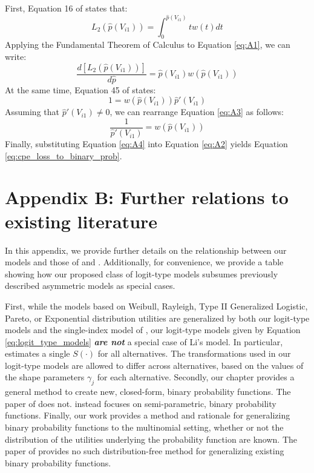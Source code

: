 First, Equation 16 of \citeauthor{buja_loss_2005} states that:
\begin{equation}\tag{A1}
\label{eq:A1}
L_{2} \left( \hat{p} \left( V_{i1} \right) \right) = \int _0 ^{\hat{p}\left( V_{i1} \right)} tw\left(t\right)dt
\end{equation}
Applying the Fundamental Theorem of Calculus to Equation \ref{eq:A1}, we can write:
\begin{equation}\tag{A2}
\label{eq:A2}
\frac{d\left[ L_{2} \left( \hat{p} \left( V_{i1} \right) \right) \right]}{d\hat{p}} = \hat{p} \left( V_{i1}  \right) w \left( \hat{p} \left( V_{i1} \right) \right)
\end{equation}
At the same time, Equation 45 of \citeauthor{buja_loss_2005} states:
\begin{equation}\tag{A3}
\label{eq:A3}
1 = w \left( \hat{p} \left( V_{i1}  \right) \right) \hat{p}' \left( V_{i1}  \right)
\end{equation}
Assuming that $\hat{p}' \left( V_{i1}  \right) \neq 0$, we can rearrange Equation \ref{eq:A3} as follows:
\begin{equation}\tag{A4}
\label{eq:A4}
\frac{1}{\hat{p}' \left( V_{i1}  \right)} = w \left( \hat{p} \left( V_{i1}  \right) \right)
\end{equation}
Finally, substituting Equation \ref{eq:A4} into Equation \ref{eq:A2} yields Equation \ref{eq:cpe_loss_to_binary_prob}.

\newpage
\section{Appendix B: Further relations to existing literature}
\label{appendix:lit_relations}
In this appendix, we provide further details on the relationship between our models and those of \citet{li_multinomial_2011} and \citet{das_generalized_2014}. Additionally, for convenience, we provide a table showing how our proposed class of logit-type models subsumes previously described asymmetric models as special cases.

First, while the models based on Weibull, Rayleigh, Type II Generalized Logistic, Pareto, or Exponential distribution utilities are generalized by both our logit-type models and the single-index model of \citet{li_multinomial_2011}, our logit-type models given by Equation \ref{eq:logit_type_models} \textbf{\textit{are not}} a special case of Li's model. In particular, \citet{li_multinomial_2011} estimates a single $S \left( \cdot \right)$ for all alternatives. The transformations used in our logit-type models are allowed to differ across alternatives, based on the values of the shape parameters $\gamma _j$ for each alternative. Secondly, our chapter provides a general method to create new, closed-form, binary probability functions. The paper of \citet{li_multinomial_2011} does not. \citet{li_multinomial_2011} instead focuses on semi-parametric, binary probability functions. Finally, our work provides a method and rationale for generalizing binary probability functions to the multinomial setting, whether or not the distribution of the utilities underlying the probability function are known. The paper of \citet{li_multinomial_2011} provides no such distribution-free method for generalizing existing binary probability functions.

